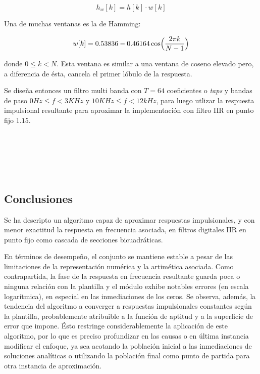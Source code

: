 \documentclass[11pt]{article}
\begin{document}
\[
h_w[k] = h[k] \cdot w[k]
\]

Una de muchas ventanas es la de Hamming:

\[
w[k] = 0.53836 - 0.46164 \cos\Bigl(\frac{2 \pi k}{N - 1}\Bigr)
\]

donde \(0 \leq k < N\). Esta ventana es similar a una ventana de coseno
elevado pero, a diferencia de ésta, cancela el primer lóbulo de la
respuesta.

Se diseña entonces un filtro multi banda con \(T = 64\) coeficientes o
\emph{taps} y bandas de paso \(0 Hz \leq f < 3 KHz\) y
\(10 KHz \leq f < 12 kHz\), para luego utlizar la respuesta impulsional
resultante para aproximar la implementación con filtro IIR en punto fijo
\(1.15\).



    \begin{center}
    \end{center}
    { \hspace*{\fill} \\}
    

    \begin{center}
    \end{center}
    { \hspace*{\fill} \\}
    

    \begin{center}
    \end{center}
    { \hspace*{\fill} \\}
    
    \subsection{Conclusiones}\label{conclusiones}

Se ha descripto un algoritmo capaz de aproximar respuestas
impulsionales, y con menor exactitud la respuesta en frecuencia
asociada, en filtros digitales IIR en punto fijo como cascada de
secciones bicuadráticas.

En términos de desempeño, el conjunto se mantiene estable a pesar de las
limitaciones de la representación numérica y la artimética asociada.
Como contrapartida, la fase de la respuesta en frecuencia resultante
guarda poca o ninguna relación con la plantilla y el módulo exhibe
notables errores (en escala logarítmica), en especial en las
inmediaciones de los ceros. Se observa, además, la tendencia del
algoritmo a converger a respuestas impulsionales constantes según la
plantilla, probablemente atribuible a la función de aptitud y a la
superficie de error que impone. Ésto restringe considerablemente la
aplicación de este algoritmo, por lo que es preciso profundizar en las
causas o en última instancia modificar el enfoque, ya sea acotando la
población inicial a las inmediaciones de soluciones analíticas o
utilizando la población final como punto de partida para otra instancia
de aproximación.
\end{document}
